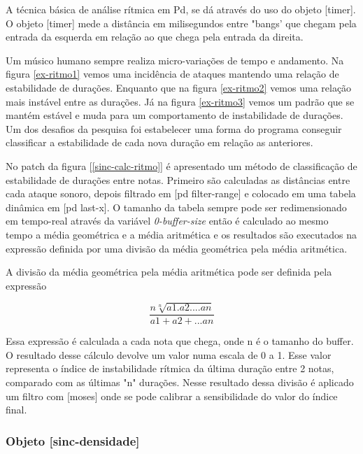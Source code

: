 \documentclass[draft]{ppgmus}
\begin{document}
A técnica básica de análise rítmica em Pd, se dá através do uso do objeto [timer].
O objeto [timer] mede a distância em milisegundos entre "bangs' que chegam pela entrada
da esquerda em relação ao que chega pela entrada da direita.%


Um músico humano sempre realiza micro-variações de tempo e andamento.
Na figura \ref{ex-ritmo1} vemos uma incidência de ataques mantendo uma relação de estabilidade
de durações. Enquanto que na figura \ref{ex-ritmo2} vemos uma relação mais instável
entre as durações. Já na figura \ref{ex-ritmo3} vemos um padrão que se mantém estável e 
muda para um comportamento de instabilidade de durações. Um dos desafios da pesquisa
foi estabelecer uma forma do programa conseguir classificar a estabilidade de cada nova duração em relação
as anteriores.

No patch da figura \ref{[sinc-calc-ritmo]} é apresentado um método de classificação de estabilidade
de durações entre notas. Primeiro são calculadas as distâncias entre cada ataque
sonoro, depois filtrado em [pd filter-range] e colocado em uma tabela dinâmica em
[pd last-x]. O tamanho da tabela sempre pode ser redimensionado em tempo-real através
da variável \textit{0-buffer-size} então é calculado ao mesmo tempo a média geométrica
e a média aritmética e os resultados são executados na expressão definida por uma
divisão da média geométrica pela média aritmética. %


A divisão da média geométrica pela média aritmética pode ser definida pela expressão

\begin{equation}
\frac{n\sqrt[n]{a1.a2....an}}{a1+a2+...an} 
\end{equation}  

Essa expressão é calculada a cada nota que chega, onde n é o tamanho do buffer.
O resultado desse cálculo devolve um valor numa escala de 0 a 1.
Esse valor representa o índice de instabilidade rítmica da última duração entre 2 notas,
comparado com as últimas "n" durações.
Nesse resultado dessa divisão é aplicado um filtro com [moses] onde se pode calibrar
a sensibilidade do valor do índice final.


\subsubsection{Objeto [sinc-densidade]}

\end{document}
